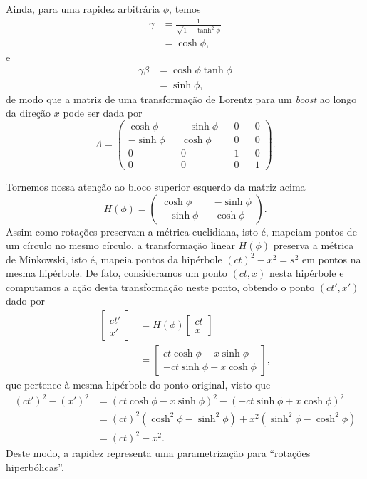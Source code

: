 \documentclass[12pt,a4paper]{article}
\numberwithin{equation}{section}
\begin{document}
Ainda, para uma rapidez arbitrária \(\phi\), temos
\begin{align*}
    \gamma &= \frac{1}{\sqrt{1 - \tanh^2\phi}}\\
           &= \cosh \phi,
\end{align*}
e
\begin{align*}
    \gamma \beta &= \cosh \phi \tanh \phi\\
                 &= \sinh \phi,
\end{align*}
de modo que a matriz de uma transformação de Lorentz para um \textit{boost} ao longo da direção \(x\) pode ser dada por
\begin{equation*}
    \Lambda = \begin{pmatrix}
        \cosh \phi && -\sinh \phi && 0 && 0\\
        -\sinh \phi && \cosh \phi && 0 && 0\\
        0 && 0 && 1 && 0 \\
        0 && 0 && 0 && 1
    \end{pmatrix}.
\end{equation*}

Tornemos nossa atenção ao bloco superior esquerdo da matriz acima
\begin{equation*}
    H(\phi) = \begin{pmatrix}
        \cosh \phi && -\sinh \phi\\
        -\sinh \phi && \cosh \phi
    \end{pmatrix}.
\end{equation*}
Assim como rotações preservam a métrica euclidiana, isto é, mapeiam pontos de um círculo no mesmo círculo, a transformação linear \(H(\phi)\) preserva a métrica de Minkowski, isto é, mapeia pontos da hipérbole \((ct)^2 - x^2 = s^2\) em pontos na mesma hipérbole. De fato, consideramos um ponto \((ct, x)\) nesta hipérbole e computamos a ação desta transformação neste ponto, obtendo o ponto \((ct', x')\) dado por
\begin{align*}
    \begin{bmatrix}ct'\\x'\end{bmatrix} &= H(\phi) \begin{bmatrix}ct\\x\end{bmatrix}\\
                                        &= \begin{bmatrix} ct \cosh \phi - x\sinh \phi\\ -ct\sinh \phi + x \cosh \phi \end{bmatrix},
\end{align*}
que pertence à mesma hipérbole do ponto original, visto que
\begin{align*}
    (ct')^2 - (x')^2 &= (ct \cosh \phi - x \sinh \phi)^2 - (-ct \sinh \phi + x \cosh \phi)^2\\
                     &= (ct)^2 \left(\cosh^2 \phi - \sinh^2 \phi\right) + x^2 \left(\sinh^2 \phi - \cosh^2 \phi\right)\\
                     &= (ct)^2 - x^2.
\end{align*}
Deste modo, a rapidez representa uma parametrização para \enquote{rotações hiperbólicas}.
\end{document}

